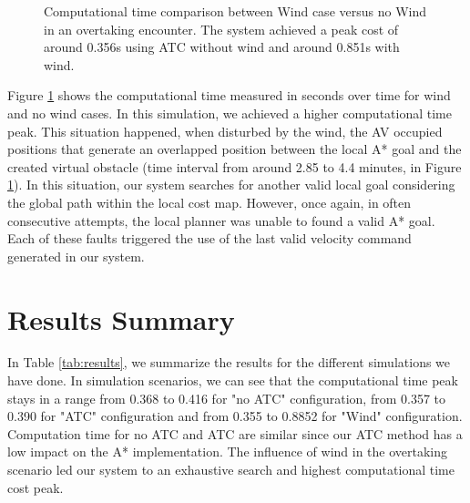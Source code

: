         
        \begin{figure}[H]
            \centering


            \caption{Computational time comparison between Wind case versus no Wind in an overtaking encounter. The system achieved a peak cost of around 0.356s using \ac{ATC} without wind and around 0.851s with wind.}
            \label{fig:plot_ov_w_vs_wind_CT}
        \end{figure}
        
        Figure \ref{fig:plot_ov_w_vs_wind_CT} shows the computational time measured in seconds over time for wind and no wind cases. In this simulation, we achieved a higher computational time peak. This situation happened, when disturbed by the wind, the \ac{AV} occupied positions that generate an overlapped position between the local A* goal and the created virtual obstacle (time interval from around 2.85 to 4.4 minutes, in Figure \ref{fig:plot_ov_w_vs_wind_CT}). In this situation, our system searches for another valid local goal considering the global path within the local cost map. However, once again, in often consecutive attempts, the local planner was unable to found a valid A* goal. Each of these faults triggered the use of the last valid velocity command generated in our system.
        


        \section{Results Summary}

        In Table \ref{tab:results}, we summarize the results for the different simulations we have done. In simulation scenarios, we can see that the computational time peak stays in a range from 0.368 to 0.416 for "no \ac{ATC}" configuration, from 0.357 to 0.390 for "\ac{ATC}" configuration and from 0.355 to 0.8852 for "Wind" configuration. Computation time for no \ac{ATC} and \ac{ATC} are similar since our \ac{ATC} method has a low impact on the A* implementation. The influence of wind in the overtaking scenario led our system to an exhaustive search and highest computational time cost peak. 
        
